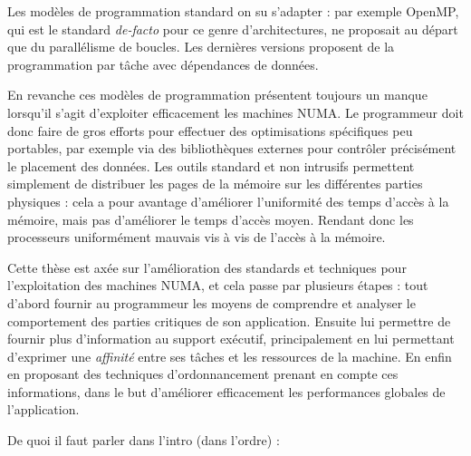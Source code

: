 Les modèles de programmation standard on su s'adapter : par exemple OpenMP, qui est le standard \emph{de-facto} pour ce genre d'architectures, ne proposait au départ que du parallélisme de boucles. Les dernières versions proposent de la programmation par tâche avec dépendances de données.

En revanche ces modèles de programmation présentent toujours un manque lorsqu'il s'agit d'exploiter efficacement les machines NUMA.
Le programmeur doit donc faire de gros efforts pour effectuer des optimisations spécifiques peu portables, par exemple via des bibliothèques externes pour contrôler précisément le placement des données.
Les outils standard et non intrusifs permettent simplement de distribuer les pages de la mémoire sur les différentes parties physiques : cela a pour avantage d'améliorer l'uniformité des temps d'accès à la mémoire, mais pas d'améliorer le temps d'accès moyen.
Rendant donc les processeurs uniformément mauvais vis à vis de l'accès à la mémoire.

Cette thèse est axée sur l'amélioration des standards et techniques pour l'exploitation des machines NUMA, et cela passe par plusieurs étapes : tout d'abord fournir au programmeur les moyens de comprendre et analyser le comportement des parties critiques de son application.
Ensuite lui permettre de fournir plus d'information au support exécutif, principalement en lui permettant d'exprimer une \emph{affinité} entre ses tâches et les ressources de la machine.
En enfin en proposant des techniques d'ordonnancement prenant en compte ces informations, dans le but d'améliorer efficacement les performances globales de l'application.



De quoi il faut parler dans l'intro (dans l'ordre) :


